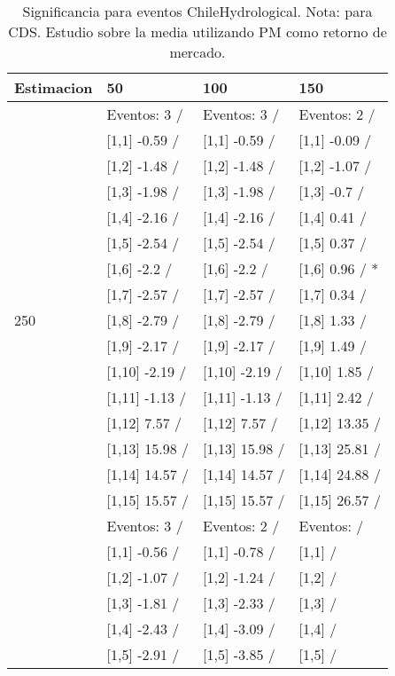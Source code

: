 \begin{table}

\caption{Significancia para eventos ChileHydrological. Nota: para CDS. Estudio sobre la media utilizando PM como retorno de mercado.}
\centering
\begin{tabular}[t]{llll}
\toprule
Estimacion & 50 & 100 & 150\\
\midrule
 & Eventos:  3 / & Eventos:  3 / & Eventos:  2 /\\
 & {}[1,1] -0.59  / & {}[1,1] -0.59  / & {}[1,1] -0.09  /\\
 & {}[1,2] -1.48  / & {}[1,2] -1.48  / & {}[1,2] -1.07  /\\
 & {}[1,3] -1.98  / & {}[1,3] -1.98  / & {}[1,3] -0.7  /\\
 & {}[1,4] -2.16  / & {}[1,4] -2.16  / & {}[1,4] 0.41  /\\
\addlinespace
 & {}[1,5] -2.54  / & {}[1,5] -2.54  / & {}[1,5] 0.37  /\\
 & {}[1,6] -2.2  / & {}[1,6] -2.2  / & {}[1,6] 0.96  / *\\
 & {}[1,7] -2.57  / & {}[1,7] -2.57  / & {}[1,7] 0.34  /\\
250 & {}[1,8] -2.79  / & {}[1,8] -2.79  / & {}[1,8] 1.33  /\\
 & {}[1,9] -2.17  / & {}[1,9] -2.17  / & {}[1,9] 1.49  /\\
\addlinespace
 & {}[1,10] -2.19  / & {}[1,10] -2.19  / & {}[1,10] 1.85  /\\
 & {}[1,11] -1.13  / & {}[1,11] -1.13  / & {}[1,11] 2.42  /\\
 & {}[1,12] 7.57  / & {}[1,12] 7.57  / & {}[1,12] 13.35  /\\
 & {}[1,13] 15.98  / & {}[1,13] 15.98  / & {}[1,13] 25.81  /\\
 & {}[1,14] 14.57  / & {}[1,14] 14.57  / & {}[1,14] 24.88  /\\
\addlinespace
 & {}[1,15] 15.57  / & {}[1,15] 15.57  / & {}[1,15] 26.57  /\\
 & Eventos:  3 / & Eventos:  2 / & Eventos:   /\\
 & {}[1,1] -0.56  / & {}[1,1] -0.78  / & {}[1,1]  /\\
 & {}[1,2] -1.07  / & {}[1,2] -1.24  / & {}[1,2]  /\\
 & {}[1,3] -1.81  / & {}[1,3] -2.33  / & {}[1,3]  /\\
\addlinespace
 & {}[1,4] -2.43  / & {}[1,4] -3.09  / & {}[1,4]  /\\
 & {}[1,5] -2.91  / & {}[1,5] -3.85  / & {}[1,5]  /\\

\end{tabular}
\end{table}
